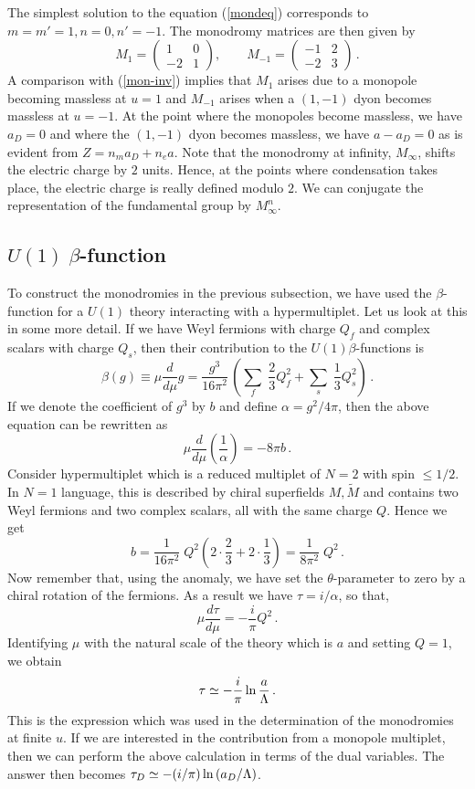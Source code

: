 The simplest solution to the equation (\ref{mondeq}) corresponds to 
$m=m'=1, n=0, n'=-1$. The monodromy matrices are then given by 
\begin{equation}
M_1=\left(\begin{array}{cc}1&0\\-2&1\end{array}\right),\qquad
M_{-1}=\left(\begin{array}{cc}-1&2\\-2&3\end{array}\right)\,.
\label{mondothers}
\end{equation}
A comparison with (\ref{mon-inv}) implies that $M_1$ arises due to a
monopole becoming massless at $u=1$ and $M_{-1}$ arises when a
$(1,-1)$ dyon becomes massless at $u=-1$. At the point where the
monopoles become massless, we have $a_D=0$ and where the $(1,-1)$ dyon
becomes massless, we have $a-a_D=0$ as is evident from $Z=n_m a_D +
n_e a$. Note that the monodromy at infinity, $M_\infty$, shifts the
electric charge by $2$ units. Hence, at the points where condensation
takes place, the electric charge is really defined modulo $2$. We can
conjugate the representation of the fundamental group by
$M^{n}_{\infty}$.

\subsection{$U(1)\; \beta$-function}

To construct the monodromies in the previous subsection, we have used
the $\beta$-function for a $U(1)$ theory interacting with a
hypermultiplet. Let us look at this in some more detail. If we have
Weyl fermions with charge $Q_{f}$ and complex scalars with charge
$Q_{s}$, then their contribution to the $U(1) \beta$-functions is
$$
\beta(g)\equiv\mu \frac{d}{d \mu}g = \frac{g^{3}}{16\pi^{2}} \,
\left( \sum_{f} \; \frac{2}{3} Q^{2}_{f} +
\sum_{s} \; \frac{1}{3} Q^{2}_{s} \right )\,.
$$
If we denote the coefficient of $g^3$ by $b$ and define $\alpha= 
g^2/4\pi$, then the above equation can be rewritten as
$$
\mu \frac{d}{d\mu} \left( \frac{1}{\alpha} \right) = - 8\pi b\,.
$$ 
Consider hypermultiplet which is a reduced multiplet of $N = 2$ with
spin $\leq 1/2$. In $N=1$ language, this is described by chiral
superfields $M,\widetilde M$ and contains two Weyl fermions and two
complex scalars, all with the same charge $Q$. Hence we get
$$
b = \frac{1}{16\pi^{2}} \; Q^{2} \left(2 \cdot \frac{2}{3} +
2 \cdot \frac{1}{3} \right) = \frac{1}{8\pi^{2}}\; Q^{2}\,.
$$
Now remember that, using the anomaly, we have set the
$\theta$-parameter to zero by a chiral rotation of the fermions. As a
result we have $\tau=i/\alpha$, so that, 
$$
\mu \frac{d\tau}{d\mu} = - \frac{i}{\pi} Q^{2}\,.
$$
Identifying $\mu$ with the natural scale of the theory which is $a$
and setting $Q=1$, we obtain
$$
\tau \simeq - \frac{i}{\pi}\,{\rm ln}\,\frac{a}{\Lambda}\,.
$$
This is the expression which was used in the determination of the
monodromies at finite $u$. If we are interested in the contribution
from a monopole multiplet, then we can perform the above calculation
in terms of the dual variables. The answer then becomes $\tau_D\simeq
-(i/\pi)\, {\rm ln}\,(a_D/\Lambda)$.   

